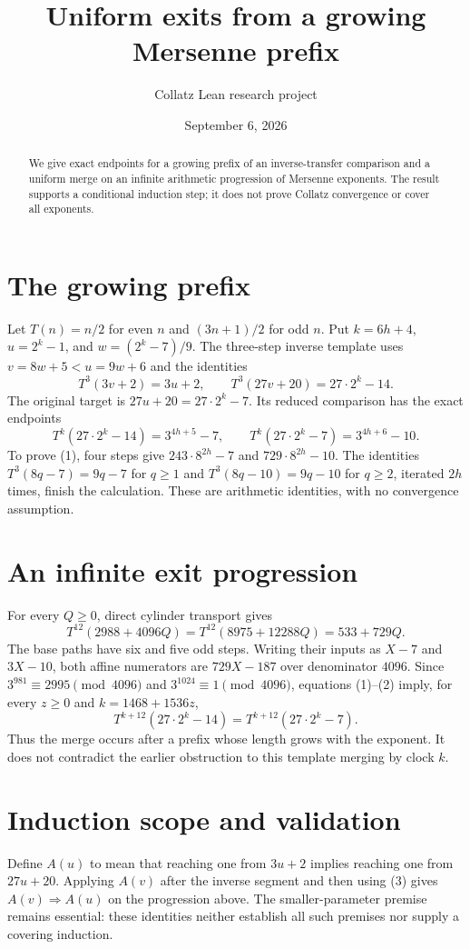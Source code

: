 \documentclass[10pt]{article}
\title{Uniform exits from a growing Mersenne prefix}
\author{Collatz Lean research project}
\date{September 6, 2026}
\begin{document}
\maketitle
\begin{abstract}
We give exact endpoints for a growing prefix of an inverse-transfer comparison and a uniform merge on an infinite arithmetic progression of Mersenne exponents. The result supports a conditional induction step; it does not prove Collatz convergence or cover all exponents.
\end{abstract}
\section{The growing prefix}
Let $T(n)=n/2$ for even $n$ and $(3n+1)/2$ for odd $n$.
Put $k=6h+4$, $u=2^k-1$, and $w=(2^k-7)/9$. The three-step inverse template uses $v=8w+5<u=9w+6$ and the identities
\[
 T^3(3v+2)=3u+2,\qquad T^3(27v+20)=27\cdot2^k-14.
\]
The original target is $27u+20=27\cdot2^k-7$. Its reduced comparison has the exact endpoints
\[
 T^k(27\cdot2^k-14)=3^{4h+5}-7,\qquad
 T^k(27\cdot2^k-7)=3^{4h+6}-10.                 \tag{1}
\]
To prove (1), four steps give $243\cdot 8^{2h}-7$ and $729\cdot 8^{2h}-10$. The identities
$T^3(8q-7)=9q-7$ for $q\ge1$ and $T^3(8q-10)=9q-10$ for $q\ge2$, iterated $2h$ times, finish the calculation. These are arithmetic identities, with no convergence assumption.
\section{An infinite exit progression}
For every $Q\ge0$, direct cylinder transport gives
\[
 T^{12}(2988+4096Q)=T^{12}(8975+12288Q)=533+729Q. \tag{2}
\]
The base paths have six and five odd steps. Writing their inputs as $X-7$ and $3X-10$, both affine numerators are $729X-187$ over denominator $4096$.
Since $3^{981}\equiv2995\pmod{4096}$ and $3^{1024}\equiv1\pmod{4096}$, equations (1)--(2) imply, for every $z\ge0$ and $k=1468+1536z$,
\[
 T^{k+12}(27\cdot2^k-14)=T^{k+12}(27\cdot2^k-7). \tag{3}
\]
Thus the merge occurs after a prefix whose length grows with the exponent. It does not contradict the earlier obstruction to this template merging by clock $k$.
\section{Induction scope and validation}
Define $A(u)$ to mean that reaching one from $3u+2$ implies reaching one from $27u+20$. Applying $A(v)$ after the inverse segment and then using (3) gives $A(v)\Rightarrow A(u)$ on the progression above. The smaller-parameter premise remains essential: these identities neither establish all such premises nor supply a covering induction.
\end{document}
